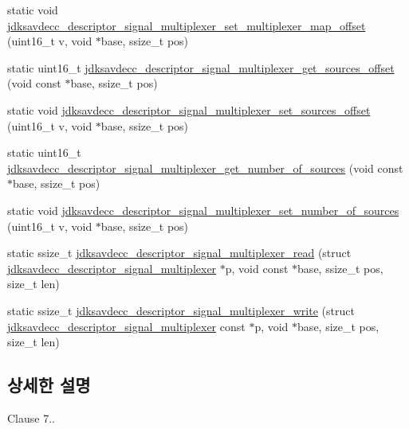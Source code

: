 \begin{DoxyCompactItemize}
\item 
static void \hyperlink{group__descriptor__signal__multiplexer_ga9546a1e90a5fc80090ac82f6cde89f5b}{jdksavdecc\+\_\+descriptor\+\_\+signal\+\_\+multiplexer\+\_\+set\+\_\+multiplexer\+\_\+map\+\_\+offset} (uint16\+\_\+t v, void $\ast$base, ssize\+\_\+t pos)
\item 
static uint16\+\_\+t \hyperlink{group__descriptor__signal__multiplexer_ga51bcc2d90939209a047281719ad75fc6}{jdksavdecc\+\_\+descriptor\+\_\+signal\+\_\+multiplexer\+\_\+get\+\_\+sources\+\_\+offset} (void const $\ast$base, ssize\+\_\+t pos)
\item 
static void \hyperlink{group__descriptor__signal__multiplexer_ga9b8ac86c9b4f59a7756bdc7c1e465c38}{jdksavdecc\+\_\+descriptor\+\_\+signal\+\_\+multiplexer\+\_\+set\+\_\+sources\+\_\+offset} (uint16\+\_\+t v, void $\ast$base, ssize\+\_\+t pos)
\item 
static uint16\+\_\+t \hyperlink{group__descriptor__signal__multiplexer_gaad4fb03f065acf2e905c3d1f5b3b2ee2}{jdksavdecc\+\_\+descriptor\+\_\+signal\+\_\+multiplexer\+\_\+get\+\_\+number\+\_\+of\+\_\+sources} (void const $\ast$base, ssize\+\_\+t pos)
\item 
static void \hyperlink{group__descriptor__signal__multiplexer_ga0efe2bf77e4ad18b1adcd05a8cbb87b7}{jdksavdecc\+\_\+descriptor\+\_\+signal\+\_\+multiplexer\+\_\+set\+\_\+number\+\_\+of\+\_\+sources} (uint16\+\_\+t v, void $\ast$base, ssize\+\_\+t pos)
\item 
static ssize\+\_\+t \hyperlink{group__descriptor__signal__multiplexer_ga61e7ca7508f350abd825573eef5f37e0}{jdksavdecc\+\_\+descriptor\+\_\+signal\+\_\+multiplexer\+\_\+read} (struct \hyperlink{structjdksavdecc__descriptor__signal__multiplexer}{jdksavdecc\+\_\+descriptor\+\_\+signal\+\_\+multiplexer} $\ast$p, void const $\ast$base, ssize\+\_\+t pos, size\+\_\+t len)
\item 
static ssize\+\_\+t \hyperlink{group__descriptor__signal__multiplexer_ga18625115a6367b05b3f993eabe654d78}{jdksavdecc\+\_\+descriptor\+\_\+signal\+\_\+multiplexer\+\_\+write} (struct \hyperlink{structjdksavdecc__descriptor__signal__multiplexer}{jdksavdecc\+\_\+descriptor\+\_\+signal\+\_\+multiplexer} const $\ast$p, void $\ast$base, size\+\_\+t pos, size\+\_\+t len)
\end{DoxyCompactItemize}


\subsection{상세한 설명}
Clause 7.. 

